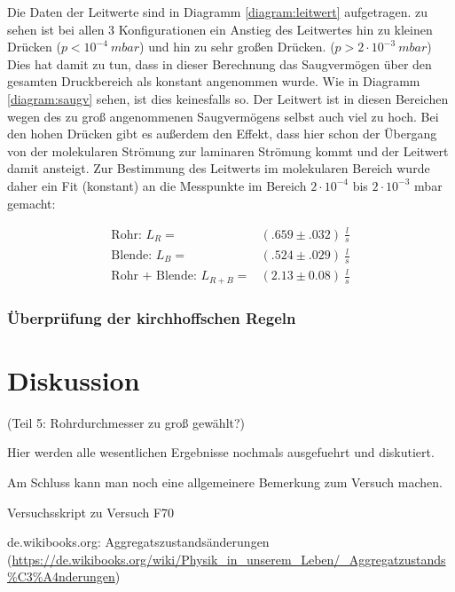 \documentclass[12pt, a4paper]{scrartcl}
\begin{document}
        Die Daten der Leitwerte sind in Diagramm \ref{diagram:leitwert}
        aufgetragen. zu sehen ist bei allen 3 Konfigurationen ein Anstieg des Leitwertes hin zu kleinen Drücken
        ($p < 10^{-4}\ mbar$)
        und hin zu sehr großen Drücken.
        ($p > 2\cdot 10^{-3}\ mbar$)
        Dies hat damit zu tun, dass in dieser Berechnung das Saugvermögen über den gesamten Druckbereich als konstant angenommen wurde. Wie in Diagramm
        \ref{diagram:saugv} sehen, ist dies keinesfalls so.
        Der Leitwert ist in diesen Bereichen wegen des zu groß angenommenen Saugvermögens selbst auch viel zu hoch. Bei den hohen Drücken gibt es außerdem den Effekt, dass hier schon der Übergang von der molekularen Strömung zur laminaren Strömung kommt und der Leitwert damit ansteigt.
        Zur Bestimmung des Leitwerts im molekularen Bereich wurde daher ein Fit (konstant) an die Messpunkte im Bereich 
        $2\cdot 10^{-4}$ bis $2\cdot 10^{-3}$ mbar
        gemacht:
        
        \begin{align*}
            \text{Rohr: }L_R=&(.659\pm.032)\ \frac l s\\
            \text{Blende: } L_B=&(.524\pm.029)\ \frac l s\\
            \text{Rohr + Blende: } L_{R+B}=&(2.13\pm0.08)\ \frac l s
        \end{align*}
        
        \subsubsection*{Überprüfung der kirchhoffschen Regeln}
        
        
	
	\section{Diskussion}
    
    (Teil 5: Rohrdurchmesser zu groß gewählt?)
	
	Hier werden alle wesentlichen Ergebnisse nochmals ausgefuehrt und diskutiert. 
	
	Am Schluss kann man noch eine allgemeinere Bemerkung zum Versuch machen.
	
	
	\newpage 
	
	\begin{thebibliography}{00}   %
		
		 Versuchsskript zu Versuch F70
		
		 de.wikibooks.org: Aggregatszustandsänderungen\\ (\url{https://de.wikibooks.org/wiki/Physik_in_unserem_Leben/_Aggregatzustands%C3%A4nderungen})
		
	\end{thebibliography}
	
\end{document}
